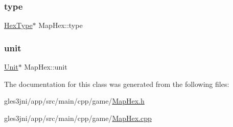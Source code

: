 \mbox{\label{class_map_hex_acdc5f2afda9662cee5cd861d2ea98111}} 
\subsubsection{\texorpdfstring{type}{type}}
{\footnotesize\ttfamily \hyperlink{class_hex_type}{Hex\+Type}$\ast$ Map\+Hex\+::type\hspace{0.3cm}{\ttfamily [private]}}

\mbox{\label{class_map_hex_ac828a1134dad20ed68d04924212467ed}} 
\subsubsection{\texorpdfstring{unit}{unit}}
{\footnotesize\ttfamily \hyperlink{class_unit}{Unit}$\ast$ Map\+Hex\+::unit\hspace{0.3cm}{\ttfamily [private]}}



The documentation for this class was generated from the following files\+:\begin{DoxyCompactItemize}
\item 
gles3jni/app/src/main/cpp/game/\hyperlink{_map_hex_8h}{Map\+Hex.\+h}\item 
gles3jni/app/src/main/cpp/game/\hyperlink{_map_hex_8cpp}{Map\+Hex.\+cpp}\end{DoxyCompactItemize}
